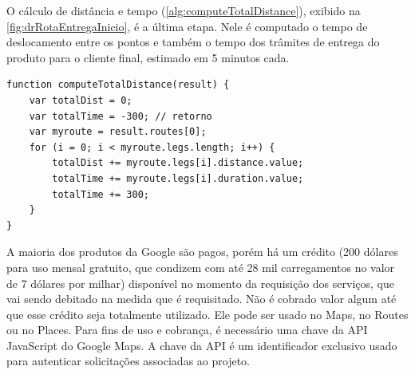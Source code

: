 O cálculo de distância e tempo (\autoref{alg:computeTotalDistance}), exibido na \autoref{fig:drRotaEntregaInicio}, é a última etapa. Nele é computado o tempo de deslocamento entre os pontos e também o tempo dos trâmites de entrega do produto para o cliente final, estimado em 5 minutos cada.

\begin{lstlisting}[caption={Delivery Routes - Função de cálculo do deslocamento}, style=htmlcssjs, label=alg:computeTotalDistance]
function computeTotalDistance(result) {
    var totalDist = 0;
    var totalTime = -300; // retorno
    var myroute = result.routes[0];
    for (i = 0; i < myroute.legs.length; i++) {
        totalDist += myroute.legs[i].distance.value;
        totalTime += myroute.legs[i].duration.value;
        totalTime += 300;
    }
}
\end{lstlisting}

A maioria dos produtos da Google são pagos, porém há um crédito (200 dólares para uso mensal gratuito, que condizem com até 28 mil carregamentos no valor de 7 dólares por milhar) disponível no momento da requisição dos serviços, que vai sendo debitado na medida que é requisitado. Não é cobrado valor algum até que esse crédito seja totalmente utilizado. Ele pode ser usado no Maps, no Routes ou no Places. Para fins de uso e cobrança, é necessário uma chave da API JavaScript do Google Maps. A chave da API é um identificador exclusivo usado para autenticar solicitações associadas ao projeto.
